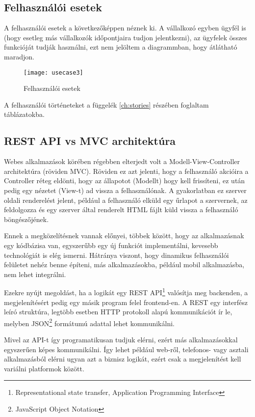 \subsection{Felhasználói esetek}
A felhasználói esetek a következőképpen néznek ki. A vállalkozó egyben ügyfél is (hogy esetleg más vállalkozók időpontjaira tudjon jelentkezni), az ügyfelek összes funkcióját tudják használni, ezt nem jelöltem a diagrammban, hogy átlátható maradjon.

\begin{figure}[H]
	\centering
	\texttt{[image: usecase3]}
	\caption{Felhasználói esetek}
	\label{fig:usecases}
\end{figure}

A felhasználói történeteket a függelék \ref{ch:stories} részében foglaltam táblázatokba.

\subsection{REST API vs MVC architektúra}
Webes alkalmazások körében régebben elterjedt volt a Modell-View-Controller architektúra (röviden MVC). Röviden ez azt jelenti, hogy a felhasználó akcióira a Controller réteg eldönti, hogy az állapotot (Modellt) hogy kell frissíteni, ez után pedig egy nézetet (View-t) ad vissza a felhasználónak. A gyakorlatban ez szerver oldali renderelést jelent, például a felhasználó elküld egy űrlapot a szervernek, az feldolgozza és egy szerver által renderelt HTML fájlt küld vissza a felhasználó böngészőjének.

Ennek a megközelítésnek vannak előnyei, többek között, hogy az alkalmazásnak egy kódbázisa van, egyszerűbb egy új funkciót implementálni, kevesebb technológiát is elég ismerni. Hátránya viszont, hogy dinamikus felhasználói felületet nehéz benne építeni, más alkalmazásokba, például mobil alkalmazásba, nem lehet integrálni.

Ezekre nyújt megoldást, ha a logikát egy REST API\footnote{Representational state transfer, Application Programming Interface} valósítja meg backenden, a megjelenítésért pedig egy másik program felel frontend-en. A REST egy interfész leíró struktúra, legtöbb esetben HTTP protokoll alapú kommunikációt ír le, melyben JSON\footnote{JavaScript Object Notation} formátumú adattal lehet kommunikálni.

Mivel az API-t így programatikusan tudjuk elérni, ezért más alkalmazásokkal egyszerűen képes kommunikálni. Így lehet például web-ről, telefonos- vagy asztali alkalmazásból elérni ugyan azt a biznisz logikát, ezért csak a megjelenítést kell variálni platformok között.

